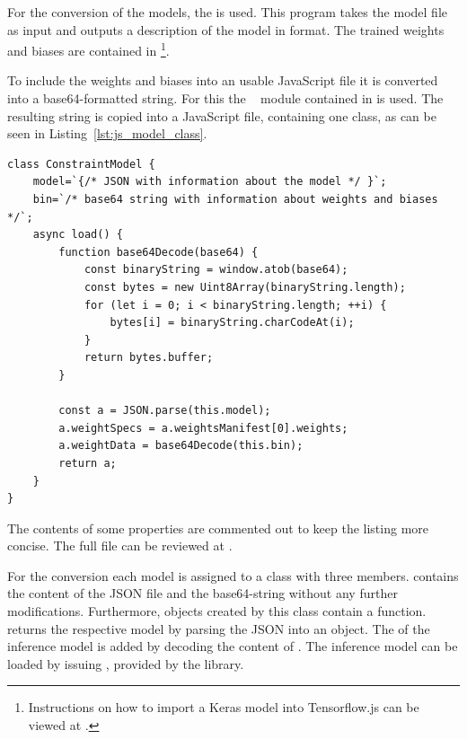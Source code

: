 For the conversion of the models, the  is used.
This program takes the model file as input and outputs a description of the model in  format.
The trained weights and biases are contained in \footnote{Instructions on how to import a Keras model into Tensorflow.js can be viewed at .}.

To include the weights and biases into an usable JavaScript file it is converted into a base64-formatted string.
For this the ~\cite{Josefsson2018} module contained in  is used.
The resulting string is copied into a JavaScript file, containing one class, as can be seen in Listing~\ref{lst:js_model_class}.

\begin{lstlisting}[label={lst:js_model_class}, caption={[JavaScript classes for Tensorflow.js.] Class definition of one of the models providing necessary functions to be used by \code{tf.loadLayersModel} to return a usable model in JavaScript. }]
class ConstraintModel {
    model=`{/* JSON with information about the model */ }`;
    bin=`/* base64 string with information about weights and biases */`;
    async load() {
        function base64Decode(base64) {
            const binaryString = window.atob(base64);
            const bytes = new Uint8Array(binaryString.length);
            for (let i = 0; i < binaryString.length; ++i) {
                bytes[i] = binaryString.charCodeAt(i);
            }
            return bytes.buffer;
        }
    
        const a = JSON.parse(this.model);
        a.weightSpecs = a.weightsManifest[0].weights;
        a.weightData = base64Decode(this.bin);
        return a;
    }
}
\end{lstlisting}

The contents of some properties are commented out to keep the listing more concise.
The full file can be reviewed at .

For the conversion each model is assigned to a class with three members.
 contains the content of the JSON file and  the base64-string without any further modifications.
Furthermore, objects created by this class contain a  function.
 returns the respective model by parsing the JSON into an object.
The  of the inference model is added by decoding the content of .
The inference model can be loaded by issuing , provided by the  library.

